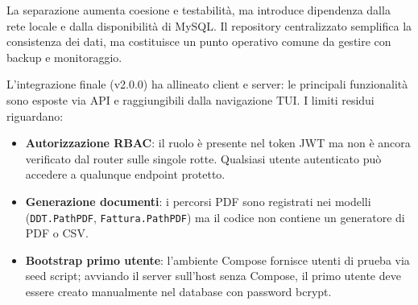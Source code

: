 \documentclass[a4paper,12pt]{article}
\begin{document}
La separazione aumenta coesione e testabilità, ma introduce dipendenza dalla rete locale e dalla disponibilità di MySQL. Il repository centralizzato semplifica la consistenza dei dati, ma costituisce un punto operativo comune da gestire con backup e monitoraggio.

L'integrazione finale (v2.0.0) ha allineato client e server: le principali funzionalità sono esposte via API e raggiungibili dalla navigazione TUI. I limiti residui riguardano:

\begin{itemize}
    \item \textbf{Autorizzazione RBAC}: il ruolo è presente nel token JWT ma non è ancora verificato dal router sulle singole rotte. Qualsiasi utente autenticato può accedere a qualunque endpoint protetto.
    \item \textbf{Generazione documenti}: i percorsi PDF sono registrati nei modelli (\texttt{DDT.PathPDF}, \texttt{Fattura.PathPDF}) ma il codice non contiene un generatore di PDF o CSV.
    \item \textbf{Bootstrap primo utente}: l'ambiente Compose fornisce utenti di prueba via seed script; avviando il server sull'host senza Compose, il primo utente deve essere creato manualmente nel database con password bcrypt.
\end{itemize}
\end{document}
